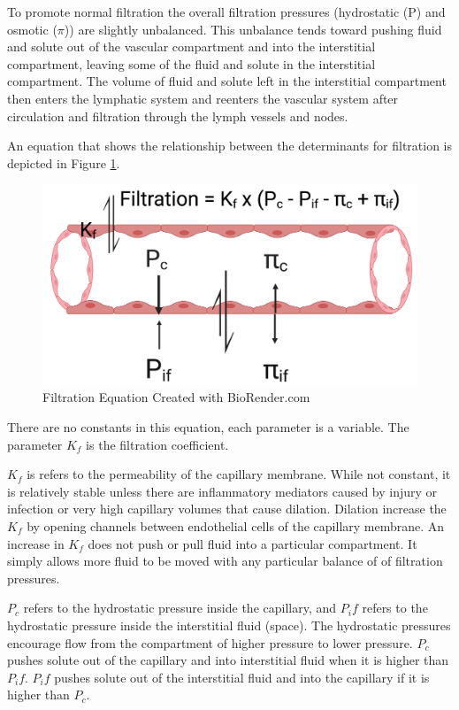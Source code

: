 To promote normal filtration the overall filtration pressures (hydrostatic (P) and osmotic ($\pi$)) are slightly unbalanced. This unbalance tends toward pushing fluid and solute out of the vascular compartment and into the interstitial compartment, leaving some of the fluid and solute in the interstitial compartment. The volume of fluid and solute left in the interstitial compartment then enters the lymphatic system and reenters the vascular system after circulation and filtration through the lymph vessels and nodes. 

An equation that shows the relationship between the determinants for filtration is depicted in Figure \ref{fig:filtration_equation}. 

\begin{figure}[!h]
    \centering
    \includegraphics[width=1\linewidth]{./figure/filtration_equation.png}
    \caption{Filtration Equation \footnotesize{Created with BioRender.com}}
    \label{fig:filtration_equation}
\end{figure}

There are no constants in this equation, each parameter is a variable. The parameter $K_f$ is the filtration coefficient. 

$K_f$ is refers to the permeability of the capillary membrane. While not constant, it is relatively stable unless there are inflammatory mediators caused by injury or infection or very high capillary volumes that cause dilation. Dilation increase the $K_f$ by opening channels between endothelial cells of the capillary membrane. An increase in $K_f$ does not push or pull fluid into a particular compartment. It simply allows more fluid to be moved with any particular balance of of filtration pressures.

$P_c$ refers to the hydrostatic pressure inside the capillary, and $P_if$ refers to the hydrostatic pressure inside the interstitial fluid (space). The hydrostatic pressures encourage flow from the compartment of higher pressure to lower pressure. $P_c$ pushes solute out of the capillary and into interstitial fluid when it is higher than $P_if$. $P_if$ pushes solute out of the interstitial fluid and into the capillary if it is higher than $P_c$.

